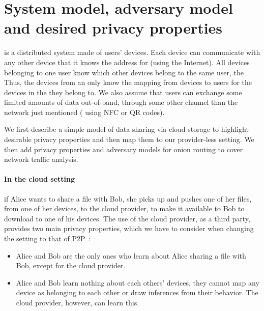 \section{System model, adversary model and desired privacy properties}%
\label{system-model}

\name is a distributed system made of users' devices. 
Each device can communicate with any other device that it knows the
address for (\eg using the Internet). All devices belonging to one user
 know which other devices belong to the same user, \ie the \squad.
Thus, the devices from an \squad only know the mapping from devices to users for the devices in 
the \squad they belong to.
We also assume that users can exchange some limited amounts of data 
out-of-band, \ie through some other channel than the network just mentioned (\eg 
using \ac{NFC} or QR codes).




We first describe a simple model of data sharing via cloud storage to
highlight desirable privacy properties and then map them to our provider-less
setting. We then add privacy properties and adversary models for onion
routing to cover network traffic analysis.

\paragraph*{In the cloud setting} if Alice wants to share a file with
Bob, she picks up and pushes one of her files, from one of her devices, to the cloud
provider, to make it available to Bob to download to
one of his devices. The use of the cloud provider, as a third party,
provides two main privacy properties, which we have to consider when
changing the setting to that of \ac{P2P}~\cite{DevilInMetadata}:
\begin{itemize}
\item Alice and Bob are the only ones  who learn 
about Alice sharing a file with Bob, except for the cloud provider.
\item Alice and Bob learn nothing about each others' devices, \ie 
they cannot map any device as belonging to each other or draw
inferences from their behavior. The cloud
provider, however, can learn this. 
\end{itemize} 

